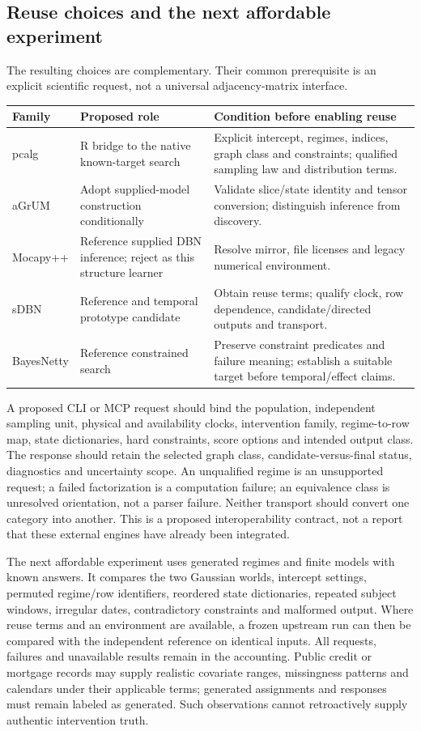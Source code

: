 \subsection{Reuse choices and the next affordable experiment}

The resulting choices are complementary. Their common prerequisite is an
explicit scientific request, not a universal adjacency-matrix interface.

\begin{longtable}{P{0.15\textwidth}P{0.34\textwidth}P{0.43\textwidth}}
\toprule
Family & Proposed role & Condition before enabling reuse\\
\midrule
\endhead
pcalg & R bridge to the native known-target search & Explicit intercept, regimes,
indices, graph class and constraints; qualified sampling law and distribution terms.\\
aGrUM & Adopt supplied-model construction conditionally & Validate slice/state
identity and tensor conversion; distinguish inference from discovery.\\
Mocapy++ & Reference supplied DBN inference; reject as this structure learner &
Resolve mirror, file licenses and legacy numerical environment.\\
sDBN & Reference and temporal prototype candidate & Obtain reuse terms; qualify
clock, row dependence, candidate/directed outputs and transport.\\
BayesNetty & Reference constrained search & Preserve constraint predicates and
failure meaning; establish a suitable target before temporal/effect claims.\\
\bottomrule
\end{longtable}

A proposed CLI or MCP request should bind the population, independent sampling
unit, physical and availability clocks, intervention family, regime-to-row map,
state dictionaries, hard constraints, score options and intended output class.
The response should retain the selected graph class, candidate-versus-final
status, diagnostics and uncertainty scope. An unqualified regime is an
unsupported request; a failed factorization is a computation failure; an
equivalence class is unresolved orientation, not a parser failure. Neither
transport should convert one category into another. This is a proposed
interoperability contract, not a report that these external engines have
already been integrated. \citep{exec16_ct_design}

The next affordable experiment uses generated regimes and finite models with
known answers. It compares the two Gaussian worlds, intercept settings,
permuted regime/row identifiers, reordered state dictionaries, repeated subject
windows, irregular dates, contradictory constraints and malformed output.
Where reuse terms and an environment are available, a frozen upstream run can
then be compared with the independent reference on identical inputs. All
requests, failures and unavailable results remain in the accounting. Public
credit or mortgage records may supply realistic covariate ranges, missingness
patterns and calendars under their applicable terms; generated assignments
and responses must remain labeled as generated. Such observations cannot
retroactively supply authentic intervention truth.

